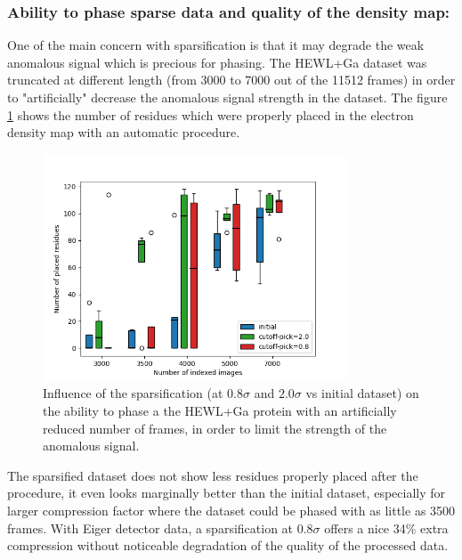 \documentclass[preprint]{iucr}              %
\begin{document}
\subsubsection{Ability to phase sparse data and quality of the density map:}
One of the main concern with sparsification is that it may degrade the weak anomalous signal which is precious for phasing.
The HEWL+Ga dataset was truncated at different length (from 3000 to 7000 out of the 11512 frames) in order to "artificially" decrease the anomalous signal strength in the dataset.
The figure \ref{nicolas_A} shows the number of residues which were properly placed in the electron density map with an automatic procedure.
\begin{figure}
\label{nicolas_A}
\begin{center}
\includegraphics[width=9cm]{nicolas5.1}
\caption{Influence of the sparsification (at $0.8\sigma$ and $2.0\sigma$ vs initial dataset) on the ability to phase a the HEWL+Ga protein with an artificially reduced number of frames, in order to limit the strength of the anomalous signal.}
\end{center}
\end{figure}

The sparsified dataset does not show less residues properly placed after the procedure, it even looks marginally better than the initial dataset, especially for larger compression factor where the dataset could be phased with as little as 3500 frames. 
With Eiger detector data, a sparsification at $0.8\sigma$ offers a nice 34\% extra compression without noticeable degradation of the quality of the processed data.
\end{document}
